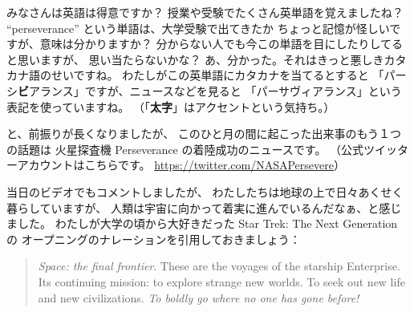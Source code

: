 \documentclass[dvipdfmx,autodetect-engine,10pt,b5paper,papersize,openany,dvipsnames]{jsbook}
\begin{document}
\begin{multicols}{2}
\vspace{6.5cm}

みなさんは英語は得意ですか？
授業や受験でたくさん英単語を覚えましたね？
``perseverance'' という単語は、大学受験で出てきたか
ちょっと記憶が怪しいですが、意味は分かりますか？
分からない人でも今この単語を目にしたりしてると思いますが、
思い当たらないかな？
あ、分かった。それはきっと悪しきカタカナ語のせいですね。
わたしがこの英単語にカタカナを当てるとすると
「パーシ{\bfseries ビ}アランス」ですが、ニュースなどを見ると
「パーサヴィアランス」という表記を使っていますね。
（「{\bfseries 太字}」はアクセントという気持ち。）

と、前振りが長くなりましたが、
このひと月の間に起こった出来事のもう１つの話題は
火星探査機 Perseverance の着陸成功のニュースです。
（公式ツイッターアカウントはこちらです。
\url{https://twitter.com/NASAPersevere}）

当日のビデオでもコメントしましたが、
わたしたちは地球の上で日々あくせく暮らしていますが、
人類は宇宙に向かって着実に進んでいるんだなぁ、と感じました。
わたしが大学の頃から大好きだった Star Trek: The Next Generation の
オープニングのナレーションを引用しておきましょう：
\begin{quotation}
  \noindent
  {\it Space: the final frontier}.
  These are the voyages of the starship Enterprise.
  Its continuing mission: to explore strange new worlds.
  To seek out new life and new civilizations.
  {\it To boldly go where no one has gone before!}
\end{quotation}



\end{multicols}
\end{document}
